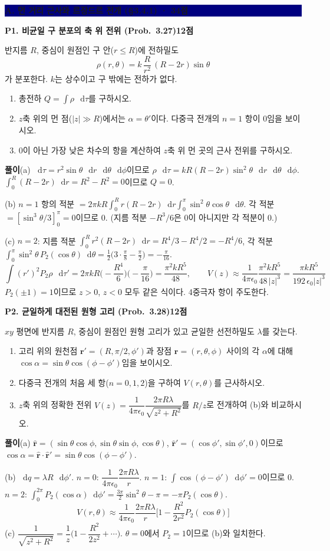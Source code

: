 \documentclass[10pt,a4paper]{article}
\newcommand{\vect}[1]{\symbf{#1}}
\newcommand{\unit}[1]{\hat{\symbf{#1}}}
\newcommand{\dd}{\mathop{}\!\mathrm{d}}
\newcommand{\problem}[3]{%
  \needspace{0.18\textheight}
  \par\vspace{2.2mm}
  {\large\bfseries\color{navy}#1\hfill{\normalsize\color{blue}#2점}}\par
  \smallskip #3\par
}
\newcommand{\sectionbar}[1]{%
  \needspace{0.25\textheight}
  \par\vspace{2.5mm}
  \colorbox{navy}{\parbox{0.965\linewidth}{\color{white}\bfseries\large #1}}
  \par\vspace{0.5mm}
}
\newcommand{\answer}[1]{\par\begin{tcolorbox}[colback=white,colframe=hair,boxrule=0.5pt,arc=0pt,left=3mm,right=3mm,top=1.5mm,bottom=1.5mm]{\color{blue}\bfseries 풀이}\quad #1\end{tcolorbox}}
\begin{document}
\sectionbar{A. 먼 거리 근사와 르장드르 전개 (§3.4.1) · 34점}
\problem{P1. 비균일 구 분포의 축 위 전위 (Prob.~3.27)}{12}{%

반지름 $R$, 중심이 원점인 구 안($r\le R$)에 전하밀도
\[
\rho(r,\theta)=k\,\frac{R}{r^2}\,(R-2r)\sin\theta
\]
가 분포한다. $k$는 상수이고 구 밖에는 전하가 없다.
\begin{enumerate}[label=(\alph*)]
  \item 총전하 $Q=\int\rho\,\dd\tau$를 구하시오.
  \item $z$축 위의 먼 점($|z|\gg R$)에서는 $\alpha=\theta'$이다. 다중극 전개의 $n=1$ 항이 0임을 보이시오.
  \item 0이 아닌 가장 낮은 차수의 항을 계산하여 $z$축 위 먼 곳의 근사 전위를 구하시오.
\end{enumerate}
\answer{(a) $\dd\tau=r^2\sin\theta\,\dd r\,\dd\theta\,\dd\phi$이므로 $\rho\,\dd\tau=kR(R-2r)\sin^2\theta\,\dd r\,\dd\theta\,\dd\phi$.
$\int_0^R(R-2r)\dd r=R^2-R^2=0$이므로 $Q=0$.

(b) $n=1$ 항의 적분 $=2\pi kR\int_0^R r(R-2r)\dd r\int_0^\pi\sin^2\theta\cos\theta\,\dd\theta$. 각 적분 $=[\sin^3\theta/3]_0^\pi=0$이므로 0. (지름 적분 $-R^3/6$은 0이 아니지만 각 적분이 0.)

(c) $n=2$: 지름 적분 $\int_0^R r^2(R-2r)\dd r=R^4/3-R^4/2=-R^4/6$,
각 적분 $\int_0^\pi\sin^2\theta\,P_2(\cos\theta)\dd\theta=\tfrac12\big(3\cdot\tfrac{\pi}{8}-\tfrac{\pi}{2}\big)=-\tfrac{\pi}{16}$.
\[
\int (r')^2P_2\rho\,\dd\tau'=2\pi kR\Big(-\frac{R^4}{6}\Big)\Big(-\frac{\pi}{16}\Big)=\frac{\pi^2kR^5}{48},
\qquad
\boxed{V(z)\approx\frac{1}{4\pi\epsilon_0}\frac{\pi^2kR^5}{48\,|z|^3}=\frac{\pi kR^5}{192\,\epsilon_0|z|^3}}
\]
$P_2(\pm1)=1$이므로 $z>0$, $z<0$ 모두 같은 식이다. 4중극자 항이 주도한다.}}
\problem{P2. 균일하게 대전된 원형 고리 (Prob.~3.28)}{12}{%

$xy$ 평면에 반지름 $R$, 중심이 원점인 원형 고리가 있고 균일한 선전하밀도 $\lambda$를 갖는다.
\begin{enumerate}[label=(\alph*)]
  \item 고리 위의 원천점 $\vect r'=(R,\pi/2,\phi')$과 장점 $\vect r=(r,\theta,\phi)$ 사이의 각 $\alpha$에 대해 $\cos\alpha=\sin\theta\cos(\phi-\phi')$임을 보이시오.
  \item 다중극 전개의 처음 세 항($n=0,1,2$)을 구하여 $V(r,\theta)$를 근사하시오.
  \item $z$축 위의 정확한 전위 $V(z)=\dfrac{1}{4\pi\epsilon_0}\dfrac{2\pi R\lambda}{\sqrt{z^2+R^2}}$를 $R/z$로 전개하여 (b)와 비교하시오.
\end{enumerate}
\answer{(a) $\unit r=(\sin\theta\cos\phi,\sin\theta\sin\phi,\cos\theta)$, $\unit r'=(\cos\phi',\sin\phi',0)$이므로 $\cos\alpha=\unit r\cdot\unit r'=\sin\theta\cos(\phi-\phi')$.

(b) $\dd q=\lambda R\,\dd\phi'$.
$n=0$: $\dfrac{1}{4\pi\epsilon_0}\dfrac{2\pi R\lambda}{r}$. \quad
$n=1$: $\int\cos(\phi-\phi')\dd\phi'=0$이므로 0.\quad
$n=2$: $\int_0^{2\pi}P_2(\cos\alpha)\dd\phi'=\tfrac{3\pi}{2}\sin^2\theta-\pi=-\pi P_2(\cos\theta)$.
\[
\boxed{V(r,\theta)\approx\frac{1}{4\pi\epsilon_0}\frac{2\pi R\lambda}{r}\Big[1-\frac{R^2}{2r^2}P_2(\cos\theta)\Big]}
\]
(c) $\dfrac{1}{\sqrt{z^2+R^2}}=\dfrac1z\Big(1-\dfrac{R^2}{2z^2}+\cdots\Big)$. $\theta=0$에서 $P_2=1$이므로 (b)와 일치한다.}}
\end{document}
